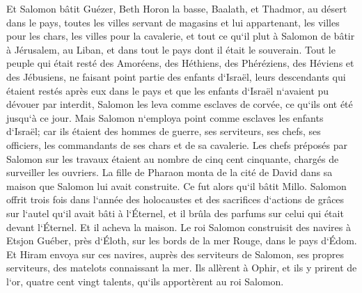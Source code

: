 \verse Et Salomon bâtit Guézer, Beth Horon la basse, 
\verse Baalath, et Thadmor, au désert dans le pays, 
\verse toutes les villes servant de magasins et lui appartenant, les villes pour les chars, les villes pour la cavalerie, et tout ce qu`il plut à Salomon de bâtir à Jérusalem, au Liban, et dans tout le pays dont il était le souverain. 
\verse Tout le peuple qui était resté des Amoréens, des Héthiens, des Phéréziens, des Héviens et des Jébusiens, ne faisant point partie des enfants d`Israël, 
\verse leurs descendants qui étaient restés après eux dans le pays et que les enfants d`Israël n`avaient pu dévouer par interdit, Salomon les leva comme esclaves de corvée, ce qu`ils ont été jusqu`à ce jour. 
\verse Mais Salomon n`employa point comme esclaves les enfants d`Israël; car ils étaient des hommes de guerre, ses serviteurs, ses chefs, ses officiers, les commandants de ses chars et de sa cavalerie. 
\verse Les chefs préposés par Salomon sur les travaux étaient au nombre de cinq cent cinquante, chargés de surveiller les ouvriers. 
\verse La fille de Pharaon monta de la cité de David dans sa maison que Salomon lui avait construite. Ce fut alors qu`il bâtit Millo. 
\verse Salomon offrit trois fois dans l`année des holocaustes et des sacrifices d`actions de grâces sur l`autel qu`il avait bâti à l`Éternel, et il brûla des parfums sur celui qui était devant l`Éternel. Et il acheva la maison. 
\verse Le roi Salomon construisit des navires à Etsjon Guéber, près d`Éloth, sur les bords de la mer Rouge, dans le pays d`Édom. 
\verse Et Hiram envoya sur ces navires, auprès des serviteurs de Salomon, ses propres serviteurs, des matelots connaissant la mer. 
\verse Ils allèrent à Ophir, et ils y prirent de l`or, quatre cent vingt talents, qu`ils apportèrent au roi Salomon. 

\chapter{}


